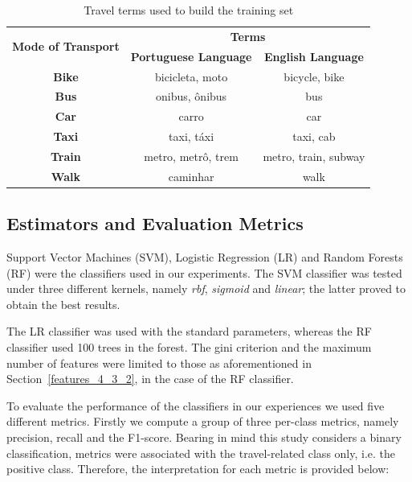 \begin{table}[htbp]
	\centering
	\small
	\caption{Travel terms used to build the training set}
	\label{tab:terms}
	\begin{tabular}{c|c|c}
		\hline
		\multirow{2}{*}{\textbf{Mode of Transport}} & \multicolumn{2}{c|}{\textbf{Terms}} \\ \cline{2-3} 
		& \multicolumn{1}{l|}{\textbf{Portuguese Language}} & \textbf{English Language} \\ \hline
		\textbf{Bike} & bicicleta, moto & bicycle, bike \\
		\textbf{Bus} & onibus, ônibus & bus \\
		\textbf{Car} & carro & car \\
		\textbf{Taxi} & taxi, táxi & taxi, cab \\
		\textbf{Train} & metro, metrô, trem & metro, train, subway \\
		\textbf{Walk} & caminhar & walk \\ \hline
	\end{tabular}
\end{table}

\subsection{Estimators and Evaluation Metrics}
Support Vector Machines (SVM), Logistic Regression (LR) and Random Forests (RF) were the classifiers used in our experiments. The SVM classifier was tested under three different kernels, namely \textit{rbf}, \textit{sigmoid} and \textit{linear}; the latter proved to obtain the best results. 

The LR classifier was used with the standard parameters, whereas the RF classifier used 100 trees in the forest. The gini criterion and the maximum number of features were limited to those as aforementioned in Section~\ref{features_4_3_2}, in the case of the RF classifier.

To evaluate the performance of the classifiers in our experiences we used five different metrics. Firstly we compute a group of three per-class metrics, namely precision, recall and the F1-score. Bearing in mind this study considers a binary classification, metrics were associated with the travel-related class only, i.e. the positive class. Therefore, the interpretation for each metric is provided below:

